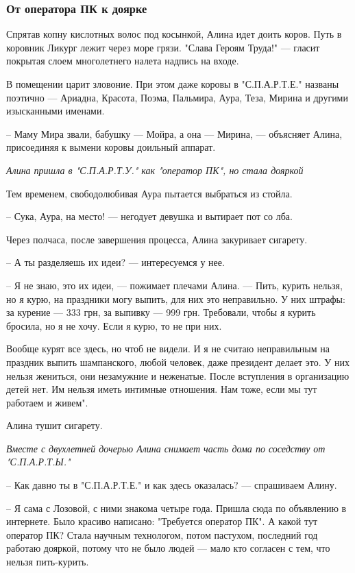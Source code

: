 \documentclass[a4paper,11pt]{extreport}
\begin{document}
\subsubsection{От оператора ПК к доярке}

Спрятав копну кислотных волос под косынкой, Алина идет доить коров. Путь в
коровник Ликург лежит через море грязи. "Слава Героям Труда!" --- гласит покрытая
слоем многолетнего налета надпись на входе.

В помещении царит зловоние. При этом даже коровы в "С.П.А.Р.Т.Е." названы
поэтично --- Ариадна, Красота, Поэма, Пальмира, Аура, Теза, Мирина и другими
изысканными именами.

– Маму Мира звали, бабушку --- Мойра, а она --- Мирина, --- объясняет Алина,
присоединяя к вымени коровы доильный аппарат.

\emph{Алина пришла в "С.П.А.Р.Т.У." как "оператор ПК", но стала дояркой}

Тем временем, свободолюбивая Аура пытается выбраться из стойла.

– Сука, Аура, на место! --- негодует девушка и вытирает пот со лба.

Через полчаса, после завершения процесса, Алина закуривает сигарету.

– А ты разделяешь их идеи? --- интересуемся у нее.

– Я не знаю, это их идеи, --- пожимает плечами Алина. --- Пить, курить нельзя, но я
курю, на праздники могу выпить, для них это неправильно. У них штрафы: за
курение --- 333 грн, за выпивку --- 999 грн. Требовали, чтобы я курить бросила, но
я не хочу. Если я курю, то не при них. 

Вообще курят все здесь, но чтоб не видели. И я не считаю неправильным на
праздник выпить шампанского, любой человек, даже президент делает это. У них
нельзя жениться, они незамужние и неженатые. После вступления в организацию
детей нет. Им нельзя иметь интимные отношения. Нам тоже, если мы тут работаем и
живем".

Алина тушит сигарету.

\emph{Вместе с двухлетней дочерью Алина снимает часть дома по соседству от "С.П.А.Р.Т.Ы."}

– Как давно ты в "С.П.А.Р.Т.Е." и как здесь оказалась? --- спрашиваем Алину.

– Я сама с Лозовой, с ними знакома четыре года. Пришла сюда по объявлению в
интернете. Было красиво написано: "Требуется оператор ПК". А какой тут оператор
ПК? Стала научным технологом, потом пастухом, последний год работаю дояркой,
потому что не было людей --- мало кто согласен с тем, что нельзя пить-курить.
\end{document}
